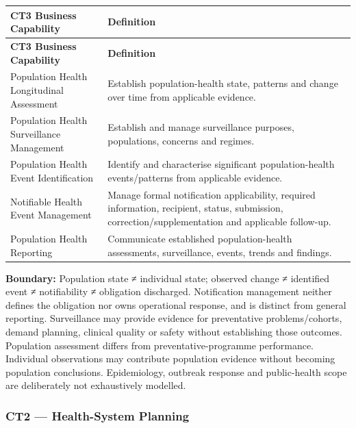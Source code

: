 \label{rad:business:606}
\begingroup\small\setlength{\TableWidth}{\dimexpr\linewidth-4\tabcolsep-3\arrayrulewidth\relax}
\begin{longtable}{|>{\raggedright\arraybackslash}p{0.35\TableWidth}|>{\raggedright\arraybackslash}p{0.65\TableWidth}|}
\hline\rowcolor{TableHead}\textbf{CT3 Business Capability} & \textbf{Definition}\\\hline\endfirsthead
\hline\rowcolor{TableHead}\textbf{CT3 Business Capability} & \textbf{Definition}\\\hline\endhead
\hline\endfoot
Population Health Longitudinal Assessment & Establish population-health state, patterns and change over time from applicable evidence.\\\hline
Population Health Surveillance Management & Establish and manage surveillance purposes, populations, concerns and regimes.\\\hline
Population Health Event Identification & Identify and characterise significant population-health events/\allowbreak{}patterns from applicable evidence.\\\hline
Notifiable Health Event Management & Manage formal notification applicability, required information, recipient, status, submission, correction/\allowbreak{}supplementation and applicable follow-up.\\\hline
Population Health Reporting & Communicate established population-health assessments, surveillance, events, trends and findings.\\\hline
\end{longtable}\endgroup
{}\label{rad:business:614}

\textbf{Boundary:} Population state ≠ individual state; observed change ≠ identified event ≠ notifiability ≠ obligation discharged. Notification management neither defines the obligation nor owns operational response, and is distinct from general reporting. Surveillance may provide evidence for preventative problems/\allowbreak{}cohorts, demand planning, clinical quality or safety without establishing those outcomes. Population assessment differs from preventative-programme performance. Individual observations may contribute population evidence without becoming population conclusions. Epidemiology, outbreak response and public-health scope are deliberately not exhaustively modelled.

\label{rad:business:616}
\subsubsection*{CT2 — Health-System Planning}
\label{rad:business:618}

